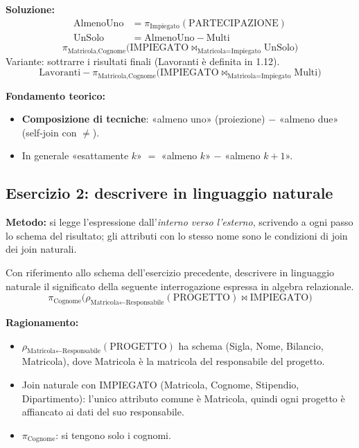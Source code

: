 \documentclass[12pt, a4paper]{article}
\newcounter{esercizio}[section]
\begin{document}
\textbf{Soluzione:}
\begin{align*}
\text{AlmenoUno} &= \pi_{\text{Impiegato}}(\text{PARTECIPAZIONE})\\
\text{UnSolo} &= \text{AlmenoUno}-\text{Multi}
\end{align*}
$$\pi_{\text{Matricola},\text{Cognome}}\big(\text{IMPIEGATO}\bowtie_{\text{Matricola}=\text{Impiegato}}\text{UnSolo}\big)$$
Variante: sottrarre i risultati finali (Lavoranti è definita in 1.12).
$$\text{Lavoranti}-\pi_{\text{Matricola},\text{Cognome}}\big(\text{IMPIEGATO}\bowtie_{\text{Matricola}=\text{Impiegato}}\text{Multi}\big)$$

\textbf{Fondamento teorico:}
\begin{itemize}
\item \textbf{Composizione di tecniche}: «almeno uno» (proiezione) $-$ «almeno due» (self-join con $\neq$).
\item In generale «esattamente $k$» $=$ «almeno $k$» $-$ «almeno $k+1$».
\end{itemize}

\subsection{Esercizio 2: descrivere in linguaggio naturale}

\textbf{Metodo:} si legge l'espressione dall'\emph{interno verso l'esterno}, scrivendo a ogni passo lo schema del risultato; gli attributi con lo stesso nome sono le condizioni di join dei join naturali.

\begin{tcolorbox}[colback=lightergray!10, colframe=tocsec, title=\textbf{Esercizio 2.1}]
Con riferimento allo schema dell'esercizio precedente, descrivere in linguaggio naturale il significato della seguente interrogazione espressa in algebra relazionale.
$$\pi_{\text{Cognome}}\big(\rho_{\text{Matricola}\leftarrow\text{Responsabile}}(\text{PROGETTO})\bowtie\text{IMPIEGATO}\big)$$
\end{tcolorbox}

\textbf{Ragionamento:}
\begin{itemize}
\item $\rho_{\text{Matricola}\leftarrow\text{Responsabile}}(\text{PROGETTO})$ ha schema (Sigla, Nome, Bilancio, Matricola), dove Matricola è la matricola del responsabile del progetto.
\item Join naturale con IMPIEGATO (Matricola, Cognome, Stipendio, Dipartimento): l'unico attributo comune è Matricola, quindi ogni progetto è affiancato ai dati del suo responsabile.
\item $\pi_{\text{Cognome}}$: si tengono solo i cognomi.
\end{itemize}
\end{document}
